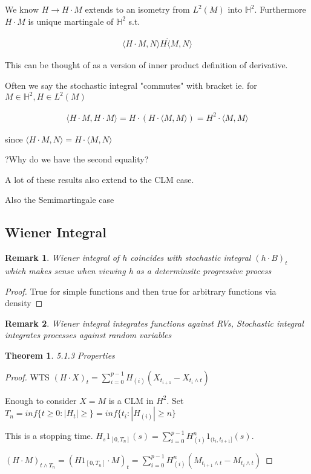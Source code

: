 \documentclass[11pt]{article}
\newtheorem{remark}{Remark}
\newtheorem{theorem}{Theorem}
\begin{document}
We know $H \to H \cdot M$ extends to an isometry from $L^2(M)$ into $\mathbb{H}^2$. Furthermore $H \cdot M$ is unique martingale of $\mathbb{H}^2$ s.t.

\begin{align*}
	\langle H \cdot M, N \rangle H \dot \langle M ,N\rangle
\end{align*}

This can be thought of as a version of inner product definition of derivative.

Often we say the stochastic integral "commutes" with bracket ie. for $M \in \mathbb{H}^2, H \in L^2(M)$

\begin{align*}
	\langle H \cdot M,H \cdot M\rangle = H \cdot (H \cdot \langle M,M \rangle) = H^2 \cdot \langle M , M \rangle 
\end{align*}

since $\langle H \cdot M,N\rangle = H \cdot \langle M, N \rangle$

?Why do we have the second equality?

A lot of these results also extend to the CLM case.

Also the Semimartingale case

\subsection{Wiener Integral}

\begin{remark}
	Wiener integral of $h$ coincides with stochastic integral $(h \cdot B)_t$ which makes sense when viewing h as a determinsitc progressive process
\end{remark}

\begin{proof}
	True for simple functions and then true for arbitrary functions via density
\end{proof}

\begin{remark}
	Wiener integral integrates functions against RVs, Stochastic integral integrates processes against random variables
\end{remark}

\begin{theorem}
	5.1.3 Properties
\end{theorem}

\begin{proof}
	WTS $(H \cdot X)_t = \sum_{i=0}^{p-1} H_{(i)} (X_{t_{i+1}} - X_{t_i \wedge t})$

	Enough to consider $X = M$ is a CLM in $H^2$. Set
	$T_n = inf\{t \geq 0 : |H_t| \geq \} = inf\{t_i : |H_{(i)}| \geq n\}$ 

	This is a stopping time. $H_s 1_{[0,T_n]}(s) = \sum_{i=0}^{p-1} H_{(i)}^n 1_{(t_i,t_{i+1}]}(s)$. 

	$(H \cdot M)_{t \wedge T_n} = (H 1_{[0,T_n]}\cdot M)_t = \sum_{i=0}^{p-1} H_{(i)}^n (M_{t_{i+1}\wedge t} - M_{t_i \wedge t})$ 
\end{proof}
\end{document}
